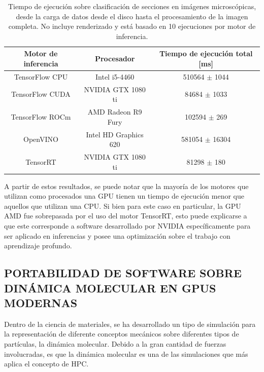 \begin{table}[h]
\centering
\caption{Tiempo de ejecución sobre clasificación de secciones en imágenes microscópicas, desde la carga de datos desde el disco hasta el procesamiento de la imagen completa. No incluye renderizado y está basado en 10 ejecuciones por motor de inferencia.}
\begin{tabular}{ccc}
\hline
Motor de inferencia & Procesador            & Tiempo de ejecución total {[}ms{]} \\ \hline
TensorFlow CPU      & Intel i5-4460         & 510564 \(\pm\) 1044                  \\
TensorFlow CUDA     & NVIDIA GTX 1080 ti    & 84684 \(\pm\) 1033                   \\
TensorFlow ROCm     & AMD Radeon R9 Fury    & 102594 \(\pm\) 269                   \\
OpenVINO            & Intel HD Graphics 620 & 581054 \(\pm\) 16304                 \\
TensorRT            & NVIDIA GTX 1080 ti    & 81298 \(\pm\) 180                    \\ \hline
\end{tabular}

\end{table}

A partir de estos resultados, se puede notar que la mayoría de los motores que utilizan como procesados una GPU tienen un tiempo de ejecución menor que aquellos que utilizan una CPU.
Si bien para este caso en particular, la GPU AMD fue sobrepasada por el uso del motor TensorRT, esto puede explicarse a que este corresponde a software desarrollado por NVIDIA específicamente para ser aplicado en inferencias y posee una optimización sobre el trabajo con aprendizaje profundo.

\subsection{PORTABILIDAD DE SOFTWARE SOBRE DINÁMICA MOLECULAR EN GPUS MODERNAS}

Dentro de la ciencia de materiales, se ha desarrollado un tipo de simulación para la representación de diferente conceptos mecánicos sobre diferentes tipos de partículas, la dinámica molecular.
Debido a la gran cantidad de fuerzas involucradas, es que la dinámica molecular es una de las simulaciones que más aplica el concepto de HPC.


